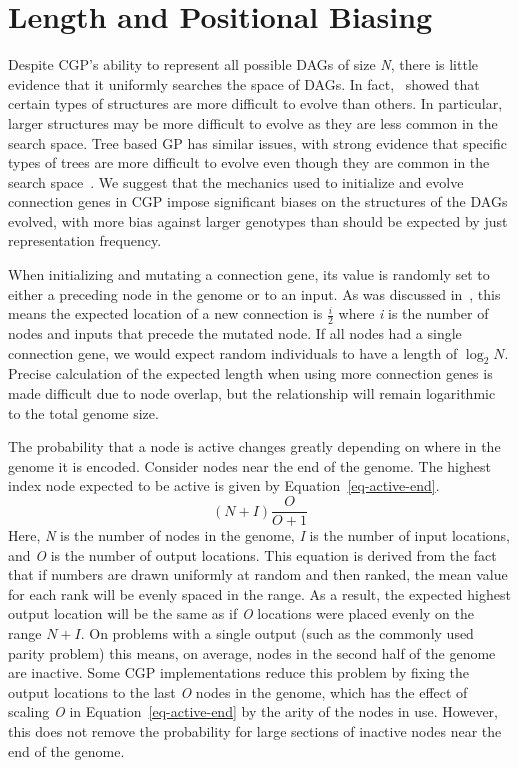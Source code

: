 \documentclass{sig-alternate}
\begin{document}
\section{Length and Positional Biasing}
\label{sec-length-biasing}
Despite CGP's ability to represent all possible DAGs
of size \emph{N}, there is little evidence that it uniformly
searches the space of DAGs. In fact,~\cite{payne:2009:bias} showed that certain types of structures
are more difficult to evolve than others.  In particular, larger structures may be more difficult to
evolve as they are less common in the search space. 
Tree based GP has similar issues,
with strong evidence that specific types of trees are more difficult to
evolve even though they are common in the search space~\cite{daida3:2003:treebias}.
We suggest that
the mechanics used to initialize and evolve connection genes in CGP
impose significant biases on the structures of the DAGs evolved, with more bias against
larger genotypes than should be expected by just representation frequency.

When initializing and mutating a connection gene, its value is randomly set to
either a preceding node in the genome or to an input.  As was discussed in~\cite{collins:2006:haystacks},
this means the expected location of a new connection is $\frac{i}{2}$ where \emph{i}
is the number of nodes and inputs that precede the mutated node.  If all nodes had
a single connection gene, we would expect random individuals to have a length of $\log_2N$.
Precise calculation of the expected length when using more connection genes is made difficult
due to node overlap, but the relationship will remain logarithmic to the total genome size.

The probability that a node is active changes greatly depending on where
in the genome it is encoded.  Consider nodes near the end of the genome.
The highest index node expected to be active is given by Equation~\ref{eq-active-end}.
\begin{equation}
  \left ( N+I \right )\frac{O}{O + 1}
  \label{eq-active-end}
\end{equation}
Here, \emph{N} is the number of nodes in the genome, \emph{I} is the number of input locations,
and \emph{O} is the number of output locations.  This equation is derived from the fact that
if numbers are drawn uniformly at random and then ranked, the mean value for each rank
will be evenly spaced in the range.  As a result, the expected highest output location will be
the same as if \emph{O} locations were placed evenly on the range $N + I$.
On problems with a single
output (such as the commonly used parity problem) this means, on average, nodes
in the second half of the genome are inactive.  
Some CGP implementations reduce this problem by
fixing the output locations to the last \emph{O} nodes in the genome, which has the effect
of scaling \emph{O} in Equation~\ref{eq-active-end} by the arity of the nodes in use.  However, this does not
remove the probability for large sections of inactive nodes near the end of the genome.
\end{document}
